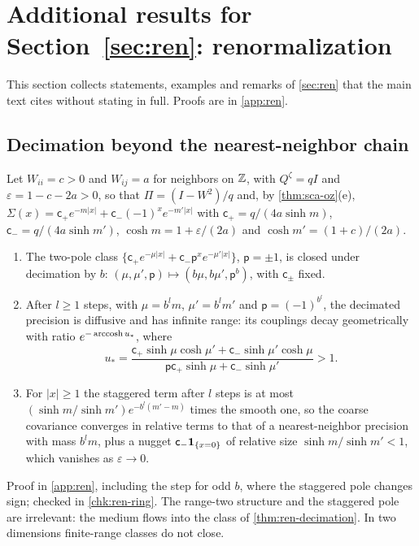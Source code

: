 \section{Additional results for \texorpdfstring{Section~\ref{sec:ren}}{Section 13}: renormalization}\label{sup:ren}

This section collects statements, examples and remarks of \cref{sec:ren} that the main text cites without stating in full. Proofs are in \cref{app:ren}.

\subsection{Decimation beyond the nearest-neighbor chain}\label{sup:ren-decimation-beyond-the-nearest-neighbor-c}

\begin{proposition}\label{prop:ren-ring}
Let $W_{ii}=c>0$ and $W_{ij}=a$ for neighbors on $\mathbb{Z}$, with $Q^\zeta=qI$ and $\varepsilon=1-c-2a>0$, so that $\Pi=(I-W^2)/q$ and, by \cref{thm:sca-oz}(e), $\Sigma(x)=\mathsf c_+e^{-m\lvert x\rvert}+\mathsf c_-(-1)^xe^{-m'\lvert x\rvert}$ with $\mathsf c_+=q/(4a\sinh m)$, $\mathsf c_-=q/(4a\sinh m')$, $\cosh m=1+\varepsilon/(2a)$ and $\cosh m'=(1+c)/(2a)$.
\begin{enumerate}
\item[(a)] The two-pole class $\{\mathsf c_+e^{-\mu\lvert x\rvert}+\mathsf c_-\mathsf p^xe^{-\mu'\lvert x\rvert}\}$, $\mathsf p=\pm1$, is closed under decimation by $b$: $(\mu,\mu',\mathsf p)\mapsto(b\mu,b\mu',\mathsf p^b)$, with $\mathsf c_\pm$ fixed.
\item[(b)] After $l\ge1$ steps, with $\mu=b^lm$, $\mu'=b^lm'$ and $\mathsf p=(-1)^{b^l}$, the decimated precision is diffusive and has infinite range: its couplings decay geometrically with ratio $e^{-\operatorname{arccosh} u_\ast}$, where
\[
u_\ast=\frac{\mathsf c_+\sinh\mu\cosh\mu'+\mathsf c_-\sinh\mu'\cosh\mu}{\mathsf p\mathsf c_+\sinh\mu+\mathsf c_-\sinh\mu'}>1.
\]
\item[(c)] For $\lvert x\rvert\ge1$ the staggered term after $l$ steps is at most $(\sinh m/\sinh m')e^{-b^l(m'-m)}$ times the smooth one, so the coarse covariance converges in relative terms to that of a nearest-neighbor precision with mass $b^lm$, plus a nugget $\mathsf c_-\mathbf{1}_{\{x=0\}}$ of relative size $\sinh m/\sinh m'<1$, which vanishes as $\varepsilon\to0$.
\end{enumerate}
\end{proposition}
Proof in \cref{app:ren}, including the step for odd $b$, where the staggered pole changes sign; checked in \cref{chk:ren-ring}. The range-two structure and the staggered pole are irrelevant: the medium flows into the class of \cref{thm:ren-decimation}. In two dimensions finite-range classes do not close.

